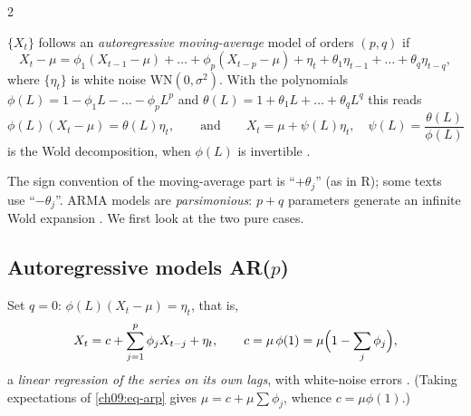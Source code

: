 \begin{paracol}{2}
\begin{definition}[ARMA$(p,q)$]\label{ch09:def-arma}
$\{X_t\}$ follows an \emph{autoregressive moving-average} model of orders $(p,q)$ if
\begin{equation}\label{ch09:eq-arma}
  X_t-\mu=\phi_1(X_{t-1}-\mu)+\dots+\phi_p(X_{t-p}-\mu)+\eta_t+\theta_1\eta_{t-1}+\dots+\theta_q\eta_{t-q},
\end{equation}
where $\{\eta_t\}$ is white noise $\mathrm{WN}(0,\sigma^2)$. With the polynomials
$\phi(L)=1-\phi_1L-\dots-\phi_pL^p$ and $\theta(L)=1+\theta_1L+\dots+\theta_qL^q$ this reads
\[
  \phi(L)(X_t-\mu)=\theta(L)\eta_t,\qquad\text{and}\qquad X_t=\mu+\psi(L)\eta_t,\quad \psi(L)=\frac{\theta(L)}{\phi(L)}
\]
is the Wold decomposition, when $\phi(L)$ is invertible .
\end{definition}

The sign convention of the moving-average part is ``$+\theta_j$'' (as in R); some texts use ``$-\theta_j$''.
ARMA models are \emph{parsimonious}: $p+q$ parameters generate an infinite Wold expansion
. We first look at the two pure cases.

\subsection{Autoregressive models AR($p$)}\label{ch09:sec-ar}
Set $q=0$: $\phi(L)(X_t-\mu)=\eta_t$, that is,
\begin{equation}\label{ch09:eq-arp}
  X_t=c+\sum_{j=1}^p\phi_jX_{t-j}+\eta_t,\qquad c=\mu\,\phi(1)=\mu\Bigl(1-\sum_j\phi_j\Bigr),
\end{equation}
a \emph{linear regression of the series on its own lags}, with white-noise errors
. (Taking expectations of \eqref{ch09:eq-arp} gives $\mu=c+\mu\sum\phi_j$,
whence $c=\mu\phi(1)$.)


\end{paracol}
